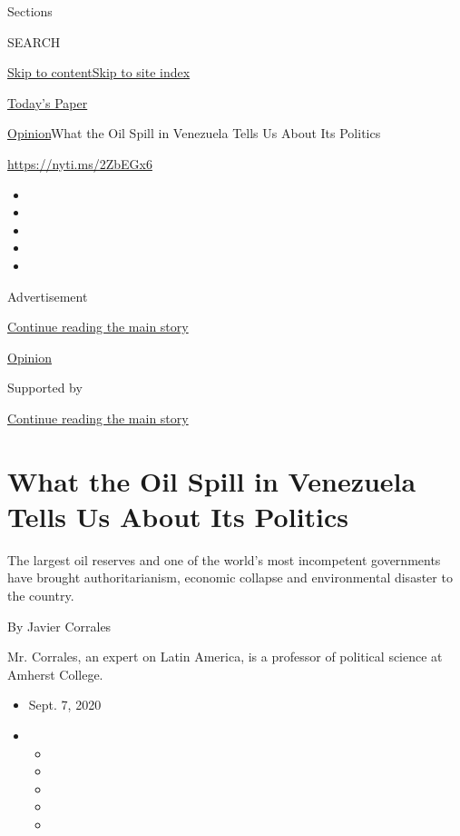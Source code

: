 Sections

SEARCH

\protect\hyperlink{site-content}{Skip to
content}\protect\hyperlink{site-index}{Skip to site index}

\href{https://myaccount.nytimes3xbfgragh.onion/auth/login?response_type=cookie\&client_id=vi}{}

\href{https://www.nytimes3xbfgragh.onion/section/todayspaper}{Today's
Paper}

\href{/section/opinion}{Opinion}\textbar{}What the Oil Spill in
Venezuela Tells Us About Its Politics

\url{https://nyti.ms/2ZbEGx6}

\begin{itemize}
\item
\item
\item
\item
\item
\end{itemize}

Advertisement

\protect\hyperlink{after-top}{Continue reading the main story}

\href{/section/opinion}{Opinion}

Supported by

\protect\hyperlink{after-sponsor}{Continue reading the main story}

\hypertarget{what-the-oil-spill-in-venezuela-tells-us-about-its-politics}{%
\section{What the Oil Spill in Venezuela Tells Us About Its
Politics}\label{what-the-oil-spill-in-venezuela-tells-us-about-its-politics}}

The largest oil reserves and one of the world's most incompetent
governments have brought authoritarianism, economic collapse and
environmental disaster to the country.

By Javier Corrales

Mr. Corrales, an expert on Latin America, is a professor of political
science at Amherst College.

\begin{itemize}
\item
  Sept. 7, 2020
\item
  \begin{itemize}
  \item
  \item
  \item
  \item
  \item
  \end{itemize}
\end{itemize}

